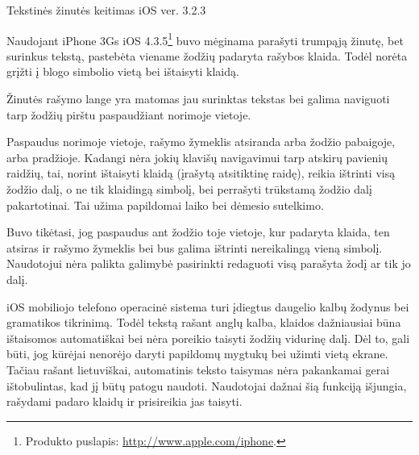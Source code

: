 \begin{xcase}{Tekstinės žinutės keitimas iOS ver. 3.2.3}
  \xcgoal
  {
  	Naudojant iPhone 3Gs 
	iOS 4.3.5\footnote{Produkto puslapis: \url{http://www.apple.com/iphone}.}
	buvo mėginama parašyti trumpąją žinutę, bet surinkus tekstą, pastebėta 
	viename žodžių padaryta rašybos klaida. Todėl norėta grįžti į blogo 
	simbolio vietą bei ištaisyti klaidą.
	
  }
  
  \xctools
  {
    Žinutės rašymo lange yra matomas jau surinktas tekstas bei galima 
    naviguoti tarp žodžių pirštu paspaudžiant norimoje vietoje. 
  }
  
  \xcresult
  {
    Paspaudus norimoje vietoje, rašymo žymeklis atsiranda arba žodžio
    pabaigoje, arba pradžioje. Kadangi nėra jokių klavišų navigavimui tarp
    atskirų pavienių raidžių, tai, norint ištaisyti klaidą 
    (įrašytą atsitiktinę raidę), reikia ištrinti visą žodžio dalį, o ne tik 
    klaidingą simbolį, bei perrašyti trūkstamą žodžio dalį pakartotinai. Tai 
    užima papildomai laiko bei dėmesio sutelkimo.
  }
  
  \xcprinciples
  {
    {
      Buvo tikėtasi, jog paspaudus ant žodžio toje vietoje, kur padaryta klaida,
      ten atsiras ir rašymo žymeklis bei bus galima ištrinti nereikalingą vieną
      simbolį.
    }
    {
      Naudotojui nėra palikta galimybė pasirinkti redaguoti visą
      parašyta žodį ar tik jo dalį.
    }
  }
  
  \xcthoughts
  {
    iOS mobiliojo telefono operacinė sistema turi įdiegtus daugelio
    kalbų žodynus bei gramatikos tikrinimą. Todėl tekstą rašant
    anglų kalba, klaidos dažniausiai būna ištaisomos automatiškai
    bei nėra poreikio taisyti žodžių vidurinę dalį. Dėl to, gali
    būti, jog kūrėjai nenorėjo daryti papildomų mygtukų bei
    užimti vietą ekrane. Tačiau rašant lietuviškai, automatinis
    teksto taisymas nėra pakankamai gerai ištobulintas, kad jį
    būtų patogu naudoti. Naudotojai dažnai šią funkciją išjungia,
    rašydami padaro klaidų ir prisireikia jas taisyti.
  }
\end{xcase}
